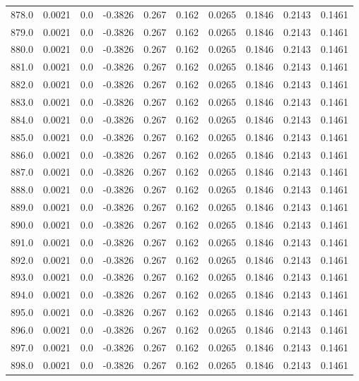 \begin{longtable}{lrrrrrrrrr}
878.0 & 0.0021 & 0.0 & -0.3826 & 0.267 & 0.162 & 0.0265 & 0.1846 & 0.2143 & 0.1461 \\
879.0 & 0.0021 & 0.0 & -0.3826 & 0.267 & 0.162 & 0.0265 & 0.1846 & 0.2143 & 0.1461 \\
880.0 & 0.0021 & 0.0 & -0.3826 & 0.267 & 0.162 & 0.0265 & 0.1846 & 0.2143 & 0.1461 \\
881.0 & 0.0021 & 0.0 & -0.3826 & 0.267 & 0.162 & 0.0265 & 0.1846 & 0.2143 & 0.1461 \\
882.0 & 0.0021 & 0.0 & -0.3826 & 0.267 & 0.162 & 0.0265 & 0.1846 & 0.2143 & 0.1461 \\
883.0 & 0.0021 & 0.0 & -0.3826 & 0.267 & 0.162 & 0.0265 & 0.1846 & 0.2143 & 0.1461 \\
884.0 & 0.0021 & 0.0 & -0.3826 & 0.267 & 0.162 & 0.0265 & 0.1846 & 0.2143 & 0.1461 \\
885.0 & 0.0021 & 0.0 & -0.3826 & 0.267 & 0.162 & 0.0265 & 0.1846 & 0.2143 & 0.1461 \\
886.0 & 0.0021 & 0.0 & -0.3826 & 0.267 & 0.162 & 0.0265 & 0.1846 & 0.2143 & 0.1461 \\
887.0 & 0.0021 & 0.0 & -0.3826 & 0.267 & 0.162 & 0.0265 & 0.1846 & 0.2143 & 0.1461 \\
888.0 & 0.0021 & 0.0 & -0.3826 & 0.267 & 0.162 & 0.0265 & 0.1846 & 0.2143 & 0.1461 \\
889.0 & 0.0021 & 0.0 & -0.3826 & 0.267 & 0.162 & 0.0265 & 0.1846 & 0.2143 & 0.1461 \\
890.0 & 0.0021 & 0.0 & -0.3826 & 0.267 & 0.162 & 0.0265 & 0.1846 & 0.2143 & 0.1461 \\
891.0 & 0.0021 & 0.0 & -0.3826 & 0.267 & 0.162 & 0.0265 & 0.1846 & 0.2143 & 0.1461 \\
892.0 & 0.0021 & 0.0 & -0.3826 & 0.267 & 0.162 & 0.0265 & 0.1846 & 0.2143 & 0.1461 \\
893.0 & 0.0021 & 0.0 & -0.3826 & 0.267 & 0.162 & 0.0265 & 0.1846 & 0.2143 & 0.1461 \\
894.0 & 0.0021 & 0.0 & -0.3826 & 0.267 & 0.162 & 0.0265 & 0.1846 & 0.2143 & 0.1461 \\
895.0 & 0.0021 & 0.0 & -0.3826 & 0.267 & 0.162 & 0.0265 & 0.1846 & 0.2143 & 0.1461 \\
896.0 & 0.0021 & 0.0 & -0.3826 & 0.267 & 0.162 & 0.0265 & 0.1846 & 0.2143 & 0.1461 \\
897.0 & 0.0021 & 0.0 & -0.3826 & 0.267 & 0.162 & 0.0265 & 0.1846 & 0.2143 & 0.1461 \\
898.0 & 0.0021 & 0.0 & -0.3826 & 0.267 & 0.162 & 0.0265 & 0.1846 & 0.2143 & 0.1461 \\

\end{longtable}
